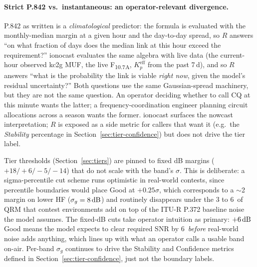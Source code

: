 \documentclass[11pt,a4paper]{article}
\newcommand{\si}[1]{\text{#1}}
\newcommand{\dB}{\text{dB}}
\begin{document}
\paragraph{Strict P.842 vs.\ instantaneous: an operator-relevant
divergence.}  P.842 as written is a \emph{climatological} predictor:
the formula is evaluated with the monthly-median margin at a given
hour and the day-to-day spread, so $R$ answers ``on what fraction of
days does the median link at this hour exceed the requirement?''
ionocast evaluates the same algebra with live data (the
current-hour observed kc2g MUF, the live F\textsubscript{10.7A},
$K_p^{\text{eff}}$ from the past 7\,d), and so $R$ answers
``what is the probability the link is viable \emph{right now}, given
the model's residual uncertainty?''  Both questions use the same Gaussian-spread machinery, but they
are not the same question.  An operator deciding whether to call
CQ at this minute wants the latter; a frequency-coordination
engineer planning circuit allocations across a season wants the
former.  ionocast surfaces the nowcast interpretation; $R$ is
exposed as a side metric for callers that want it (e.g.\ the
\emph{Stability} percentage in Section~\ref{sec:tier-confidence})
but does not drive the tier label.

Tier thresholds (Section~\ref{sec:tiers}) are pinned to fixed dB
margins ($+18 / +6 / -5 / -14$) that do not scale with the band's
$\sigma$.  This is deliberate: a
sigma-percentile cut scheme runs optimistic in real-world
contests, since percentile boundaries would place Good at
$+0.25\sigma$,
which corresponds to a $\sim$2\,\si{\dB} margin on lower HF
($\sigma_g = 8\,\si{\dB}$) and routinely disappears under the
3 to 6\,\si{\dB} of QRM that contest environments add on top of the
ITU-R P.372 baseline noise the model assumes.  The fixed-dB cuts
take operator intuition as primary: $+6\,\si{\dB}$ Good means the
model expects to clear required SNR by 6\,\si{\dB} \emph{before}
real-world noise adds anything, which lines up with what an
operator calls a usable band on-air.  Per-band $\sigma_g$
continues to drive the Stability and Confidence metrics defined
in Section~\ref{sec:tier-confidence}, just not the boundary
labels.
\end{document}
